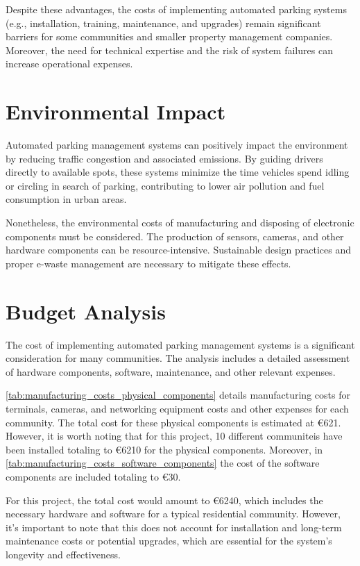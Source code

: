 Despite these advantages, the costs of implementing automated parking systems (e.g., installation, training, maintenance, and upgrades) remain significant barriers for some communities and smaller property management companies. Moreover, the need for technical expertise and the risk of system failures can increase operational expenses.

\section{Environmental Impact}

Automated parking management systems can positively impact the environment by reducing traffic congestion and associated emissions. By guiding drivers directly to available spots, these systems minimize the time vehicles spend idling or circling in search of parking, contributing to lower air pollution and fuel consumption in urban areas.

Nonetheless, the environmental costs of manufacturing and disposing of electronic components must be considered. The production of sensors, cameras, and other hardware components can be resource-intensive. Sustainable design practices and proper e-waste management are necessary to mitigate these effects.

\section{Budget Analysis}

The cost of implementing automated parking management systems is a significant consideration for many communities. The analysis includes a detailed assessment of hardware components, software, maintenance, and other relevant expenses.

\cref{tab:manufacturing_costs_physical_components} details manufacturing costs for terminals, cameras, and networking equipment costs and other expenses for each community. The total cost for these physical components is estimated at \euro 621. However, it is worth noting that for this project, 10 different communiteis have been installed totaling to \euro 6210 for the physical components. Moreover, in \cref{tab:manufacturing_costs_software_components} the cost of the software components are included totaling to \euro 30.

For this project, the total cost would amount to \euro 6240, which includes the necessary hardware and software for a typical residential community. However, it's important to note that this does not account for installation and long-term maintenance costs or potential upgrades, which are essential for the system's longevity and effectiveness.

